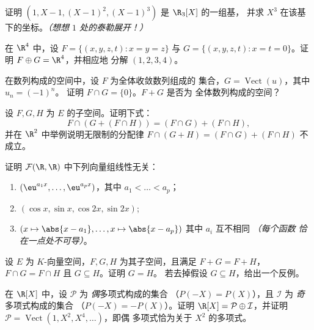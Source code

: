 \begin{exercise}[$\star$]\label{exo:b1:vspaces:4}
证明 $(1, X - 1, (X-1)^2, (X-1)^3)$ 是 $\R_3[X]$ 的一组基，
并求 $X^3$ 在该基下的坐标。\emph{（想想 $1$ 处的泰勒展开！）}
\end{exercise}

\begin{exercise}[$\star\star$]\label{exo:b1:vspaces:5}
在 $\R^4$ 中，设 $F = \{(x,y,z,t) : x = y = z\}$ 与 $G = \{(x,y,z,t)
: x = t = 0\}$。证明 $F \oplus G = \R^4$，并相应地
分解 $(1,2,3,4)$。
\end{exercise}

\begin{exercise}[$\star\star$]\label{exo:b1:vspaces:6}
在数列构成的空间中，设 $F$ 为全体收敛数列组成的
集合，$G = \operatorname{Vect}(u)$，其中 $u_n = (-1)^n$。
证明 $F \cap G = \{0\}$。$F + G$ 是否为
全体数列构成的空间？
\end{exercise}

\begin{exercise}[$\star\star$]\label{exo:b1:vspaces:7}
设 $F, G, H$ 为 $E$ 的子空间。证明下式：
\[
F \cap (G + (F \cap H)) = (F \cap G) + (F \cap H),
\]
并在 $\R^2$ 中举例说明无限制的分配律
$F \cap (G + H) = (F\cap G) + (F \cap H)$ 不成立。
\end{exercise}

\begin{exercise}[$\star\star\star$]\label{exo:b1:vspaces:8}
证明 $\mathcal{F}(\R, \R)$ 中下列向量组线性无关：
\begin{enumerate}
  \item $(\eu^{a_1 x}, \dots, \eu^{a_p x})$，其中 $a_1 < \dots < a_p$；
  \item $(\cos x, \sin x, \cos 2x, \sin 2x)$;
  \item $(x \mapsto \abs{x - a_1}, \dots, x \mapsto \abs{x - a_p})$
        其中 $a_i$ 互不相同 \emph{（每个函数
        恰在一点处不可导）}。
\end{enumerate}
\end{exercise}

\begin{exercise}[$\star\star\star$]\label{exo:b1:vspaces:9}
设 $E$ 为 $K$-向量空间，$F, G, H$ 为其子空间，且满足 $F + G =
F + H$，$F \cap G = F \cap H$ 且 $G \subseteq H$。证明 $G = H$。
若去掉假设 $G \subseteq H$，给出一个反例。
\end{exercise}

\begin{exercise}[$\star\star$]\label{exo:b1:vspaces:10}
在 $\R[X]$ 中，设 $\mathcal P$ 为 \emph{偶}多项式构成的集合
（$P(-X) = P(X)$），且 $\mathcal I$ 为 \emph{奇}多项式构成的集合
（$P(-X) = -P(X)$）。证明 $\R[X] = \mathcal P \oplus \mathcal
I$，并证明 $\mathcal P =
\operatorname{Vect}(1, X^2, X^4, \dots)$，即偶
多项式恰为关于 $X^2$ 的多项式。
\end{exercise}

